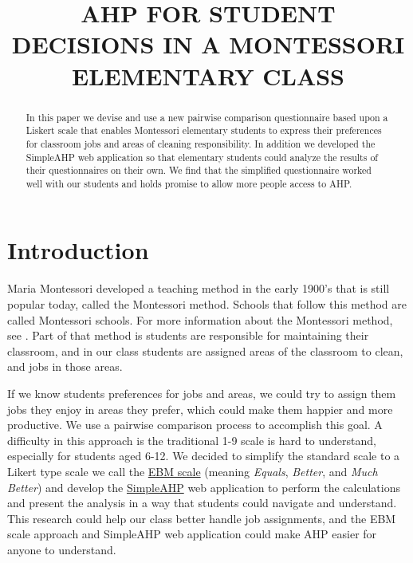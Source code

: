\documentclass[11pt]{article}
\title{AHP FOR STUDENT DECISIONS IN A MONTESSORI ELEMENTARY CLASS}
\renewcommand{\maketitle}{\begin{center}{\Large \textbf{\thetitle}} \end{center}}
\begin{document}
\maketitle
\thispagestyle{fancy}

\begin{abstract}
In this paper we devise and use a new pairwise comparison questionnaire based upon a
Liskert scale that enables
Montessori elementary students to express their preferences for classroom jobs and
areas of cleaning responsibility.  In addition we developed the SimpleAHP web application
so that elementary students could analyze the results of their questionnaires on their
own.  We find that the simplified questionnaire worked well with our students and holds
promise to allow more people access to AHP.


\end{abstract}


\section{Introduction}
Maria Montessori developed a teaching method in the early 1900's that is still popular today, called the Montessori method.  Schools that follow this method are called Montessori schools.  For more information about the Montessori method, see \citep{montessori2013montessori}.  Part of that method is students are responsible for maintaining their classroom, and in our class students are assigned areas of the classroom to clean, and jobs in those areas.

If we know students preferences for jobs and areas, we could
try to assign them jobs they enjoy in areas they prefer, which could
make them happier and more productive.  We use a pairwise comparison
process to accomplish this goal.  A difficulty in this approach is
the traditional 1-9 scale is hard to understand, especially for students
aged 6-12.  We decided to simplify the standard scale to a Likert type
scale we call the \ul{EBM scale} (meaning \emph{Equals}, 
\emph{Better}, and \emph{Much Better}) and develop the \ul{SimpleAHP}
web application to perform the calculations and present the analysis in a
way that students could navigate and understand.  This research could help our class
better handle job assignments, and the EBM scale approach and SimpleAHP web
application could make AHP
easier for anyone to understand.
\end{document}
